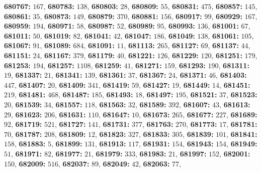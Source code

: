 \textsf{\bfseries 680767:} $167$, \textsf{\bfseries 680783:} $138$, \textsf{\bfseries 680803:} $28$, \textsf{\bfseries 680809:} $55$, \textsf{\bfseries 680831:} $475$, \textsf{\bfseries 680857:} $145$, \textsf{\bfseries 680861:} $35$, \textsf{\bfseries 680873:} $149$, \textsf{\bfseries 680879:} $370$, \textsf{\bfseries 680881:} $156$, \textsf{\bfseries 680917:} $99$, \textsf{\bfseries 680929:} $167$, \textsf{\bfseries 680959:} $194$, \textsf{\bfseries 680971:} $58$, \textsf{\bfseries 680987:} $52$, \textsf{\bfseries 680989:} $95$, \textsf{\bfseries 680993:} $136$, \textsf{\bfseries 681001:} $67$, \textsf{\bfseries 681011:} $50$, \textsf{\bfseries 681019:} $82$, \textsf{\bfseries 681041:} $42$, \textsf{\bfseries 681047:} $186$, \textsf{\bfseries 681049:} $138$, \textsf{\bfseries 681061:} $105$, \textsf{\bfseries 681067:} $91$, \textsf{\bfseries 681089:} $684$, \textsf{\bfseries 681091:} $11$, \textsf{\bfseries 681113:} $265$, \textsf{\bfseries 681127:} $69$, \textsf{\bfseries 681137:} $44$, \textsf{\bfseries 681151:} $24$, \textsf{\bfseries 681167:} $379$, \textsf{\bfseries 681179:} $40$, \textsf{\bfseries 681221:} $126$, \textsf{\bfseries 681229:} $120$, \textsf{\bfseries 681251:} $179$, \textsf{\bfseries 681253:} $194$, \textsf{\bfseries 681257:} $1108$, \textsf{\bfseries 681259:} $41$, \textsf{\bfseries 681271:} $159$, \textsf{\bfseries 681293:} $190$, \textsf{\bfseries 681311:} $19$, \textsf{\bfseries 681337:} $21$, \textsf{\bfseries 681341:} $139$, \textsf{\bfseries 681361:} $37$, \textsf{\bfseries 681367:} $24$, \textsf{\bfseries 681371:} $46$, \textsf{\bfseries 681403:} $447$, \textsf{\bfseries 681407:} $20$, \textsf{\bfseries 681409:} $341$, \textsf{\bfseries 681419:} $59$, \textsf{\bfseries 681427:} $19$, \textsf{\bfseries 681449:} $14$, \textsf{\bfseries 681451:} $219$, \textsf{\bfseries 681481:} $468$, \textsf{\bfseries 681487:} $185$, \textsf{\bfseries 681493:} $18$, \textsf{\bfseries 681497:} $195$, \textsf{\bfseries 681521:} $37$, \textsf{\bfseries 681523:} $20$, \textsf{\bfseries 681539:} $34$, \textsf{\bfseries 681557:} $118$, \textsf{\bfseries 681563:} $32$, \textsf{\bfseries 681589:} $392$, \textsf{\bfseries 681607:} $43$, \textsf{\bfseries 681613:} $29$, \textsf{\bfseries 681623:} $206$, \textsf{\bfseries 681631:} $110$, \textsf{\bfseries 681647:} $10$, \textsf{\bfseries 681673:} $265$, \textsf{\bfseries 681677:} $227$, \textsf{\bfseries 681689:} $92$, \textsf{\bfseries 681719:} $521$, \textsf{\bfseries 681727:} $141$, \textsf{\bfseries 681731:} $377$, \textsf{\bfseries 681763:} $270$, \textsf{\bfseries 681773:} $17$, \textsf{\bfseries 681781:} $70$, \textsf{\bfseries 681787:} $208$, \textsf{\bfseries 681809:} $12$, \textsf{\bfseries 681823:} $327$, \textsf{\bfseries 681833:} $305$, \textsf{\bfseries 681839:} $101$, \textsf{\bfseries 681841:} $158$, \textsf{\bfseries 681883:} $5$, \textsf{\bfseries 681899:} $131$, \textsf{\bfseries 681913:} $117$, \textsf{\bfseries 681931:} $154$, \textsf{\bfseries 681943:} $154$, \textsf{\bfseries 681949:} $51$, \textsf{\bfseries 681971:} $82$, \textsf{\bfseries 681977:} $21$, \textsf{\bfseries 681979:} $333$, \textsf{\bfseries 681983:} $21$, \textsf{\bfseries 681997:} $152$, \textsf{\bfseries 682001:} $150$, \textsf{\bfseries 682009:} $516$, \textsf{\bfseries 682037:} $89$, \textsf{\bfseries 682049:} $42$, \textsf{\bfseries 682063:} $77$, 
